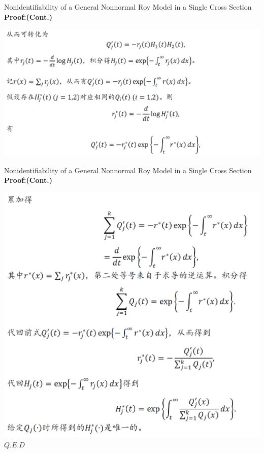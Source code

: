 \documentclass{beamer}
\begin{document}
\begin{frame}{Nonidentifiability of a General Nonnormal Roy Model in a Single Cross Section}
	\textbf{Proof:(Cont.)}
	
	\includegraphics[scale=0.5]{theorem7_3}
\end{frame}
\begin{frame}{Nonidentifiability of a General Nonnormal Roy Model in a Single Cross Section}
	\textbf{Proof:(Cont.)}
	
	\includegraphics[scale=0.4]{theorem7_4}
\hfill $Q.E.D$
\end{frame}
\end{document}
